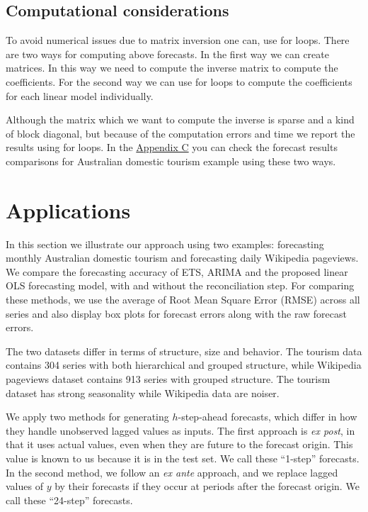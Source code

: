 \documentclass[11pt,a4paper,]{article}
\begin{document}
\hypertarget{computational-considerations}{%
\subsection{Computational
considerations}\label{computational-considerations}}

To avoid numerical issues due to matrix inversion one can, use for
loops. There are two ways for computing above forecasts. In the first
way we can create matrices. In this way we need to compute the inverse
matrix to compute the coefficients. For the second way we can use for
loops to compute the coefficients for each linear model individually.

Although the matrix which we want to compute the inverse is sparse and a
kind of block diagonal, but because of the computation errors and time
we report the results using for loops. In the
\protect\hyperlink{appendixC}{Appendix C} you can check the forecast
results comparisons for Australian domestic tourism example using these
two ways.

\hypertarget{applications}{%
\section{Applications}\label{applications}}

In this section we illustrate our approach using two examples:
forecasting monthly Australian domestic tourism and forecasting daily
Wikipedia pageviews. We compare the forecasting accuracy of ETS, ARIMA
and the proposed linear OLS forecasting model, with and without the
reconciliation step. For comparing these methods, we use the average of
Root Mean Square Error (RMSE) across all series and also display box
plots for forecast errors along with the raw forecast errors.

The two datasets differ in terms of structure, size and behavior. The
tourism data contains 304 series with both hierarchical and grouped
structure, while Wikipedia pageviews dataset contains 913 series with
grouped structure. The tourism dataset has strong seasonality while
Wikipedia data are noiser.

We apply two methods for generating \(h\)-step-ahead forecasts, which
differ in how they handle unobserved lagged values as inputs. The first
approach is \emph{ex post}, in that it uses actual values, even when
they are future to the forecast origin. This value is known to us
because it is in the test set. We call these ``1-step'' forecasts. In
the second method, we follow an \emph{ex ante} approach, and we replace
lagged values of \(y\) by their forecasts if they occur at periods after
the forecast origin. We call these ``24-step'' forecasts.
\end{document}
